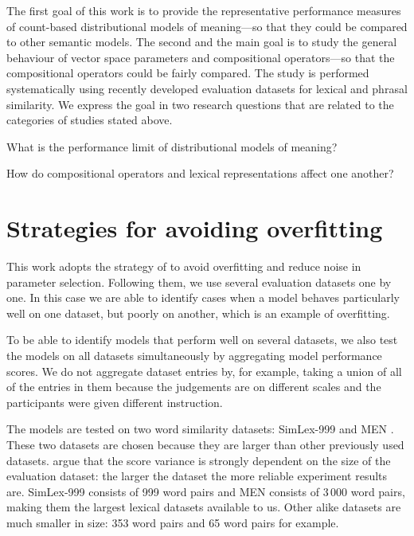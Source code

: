 
The first goal of this work is to provide the representative performance measures of count-based distributional models of meaning---so that they could be compared to other semantic models. The second and the main goal is to study the general behaviour of vector space parameters and compositional operators---so that the compositional operators could be fairly compared. The study is performed systematically using recently developed evaluation datasets for lexical and phrasal similarity. We express the goal in two research questions that are related to the categories of studies stated above.
\begin{compactitem}
\item What is the performance limit of distributional models of meaning?
\item How do compositional operators and lexical representations affect one another?
\end{compactitem}

\section{Strategies for avoiding overfitting}
\label{sec:avoiding-overfitting}

This work adopts the strategy of  to avoid overfitting and reduce noise in parameter selection. Following them, we use several evaluation datasets one by one. In this case we are able to identify cases when a model behaves particularly well on one dataset, but poorly on another, which is an example of overfitting.

To be able to identify models that perform well on several datasets, we also test the models on all datasets simultaneously by aggregating model performance scores. We do not aggregate dataset entries by, for example, taking a union of all of the entries in them because the judgements are on different scales and the participants were given different instruction.

The models are tested on two word similarity datasets: SimLex-999 \cite{hill2014simlex} and MEN \cite{Bruni:2014:MDS:2655713.2655714}. These two datasets are chosen because they are larger than other previously used datasets. \citet{W16-2502} argue that the score variance is strongly dependent on the size of the evaluation dataset: the larger the dataset the more reliable experiment results are. SimLex-999 consists of 999 word pairs and MEN consists of 3\,000 word pairs, making them the largest lexical datasets available to us. Other alike datasets are much smaller in size: 353 word pairs \cite{2002:PSC:503104.503110} and 65 word pairs \cite{Rubenstein:1965:CCS:365628.365657} for example.

